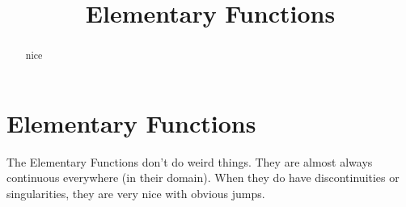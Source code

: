 \documentclass{ximera}
\title{Elementary Functions}
\begin{document}
\begin{abstract}
nice
\end{abstract}
\maketitle












\section{Elementary Functions}




The Elementary Functions don't do weird things.  They are almost always continuous everywhere (in their domain).  When they do have discontinuities or singularities, they are very nice with obvious jumps.
\end{document}
